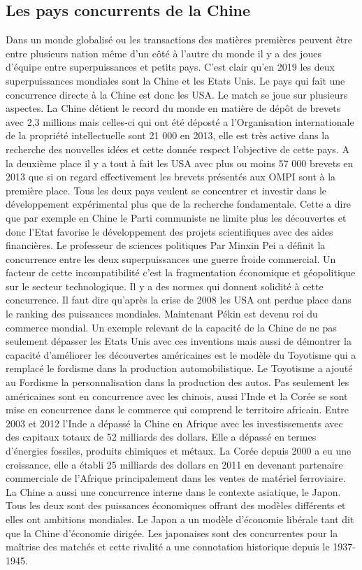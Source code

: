 \subsection{Les pays concurrents de la Chine}
Dans un monde globalisé ou les transactions des matières premières peuvent être entre plusieurs nation même d’un côté à l’autre du monde il y a des joues d’équipe entre superpuissances et petits pays. C’est clair qu’en 2019 les deux superpuissances mondiales sont la Chine et les Etats Unis. 
Le pays qui fait une concurrence directe à la Chine est donc les USA. Le match se joue sur plusieurs aspectes. La Chine détient le record du monde en matière de dépôt de brevets avec 2,3 millions mais celles-ci qui ont été déposté a l’Organisation internationale de la propriété intellectuelle sont 21 000 en 2013, elle est très active dans la recherche des nouvelles idées et cette donnée respect l’objective de cette pays. A la deuxième place il y a tout à fait les USA avec plus ou moins 57 000 brevets en 2013 que si on regard effectivement les brevets présentés aux OMPI sont à la première place. Tous les deux pays veulent se concentrer et investir dans le développement expérimental plus que de la recherche fondamentale.  Cette a dire que par exemple en Chine le Parti communiste ne limite plus les découvertes et donc l’Etat favorise le développement des projets scientifiques avec des aides financières.
Le professeur de sciences politiques Par Minxin Pei a définit la concurrence entre les deux superpuissances une guerre froide commercial. Un facteur de cette incompatibilité c’est la fragmentation économique et géopolitique sur le secteur technologique. Il y a des normes qui donnent solidité à cette concurrence.   
Il faut dire qu’après la crise de 2008 les USA ont perdue place dans le ranking des puissances mondiales.  Maintenant Pékin est devenu roi du commerce mondial.
Un exemple relevant de la capacité de la Chine de ne pas seulement dépasser les Etats Unis avec ces inventions mais aussi de démontrer la capacité d’améliorer les découvertes américaines est le modèle du Toyotisme qui a remplacé le fordisme dans la production automobilistique. Le Toyotisme a ajouté au Fordisme la personnalisation dans la production des autos.
Pas seulement les américaines sont en concurrence avec les chinois, aussi l’Inde et la Corée se sont mise en concurrence dans le commerce qui comprend le territoire africain. 
Entre 2003 et 2012 l’Inde a dépassé la Chine en Afrique avec les investissements avec des capitaux totaux de 52 milliards des dollars. Elle a dépassé en termes d’énergies fossiles, produits chimiques et métaux.
La Corée depuis 2000 a eu une croissance, elle a établi 25 milliards des dollars en 2011 en devenant partenaire commerciale de l’Afrique principalement dans les ventes de matériel ferroviaire.
La Chine a aussi une concurrence interne dans le contexte asiatique, le Japon. Tous les deux sont des puissances économiques offrant des modèles différents et elles ont ambitions mondiales. Le Japon a un modèle d’économie libérale tant dit que la Chine d’économie dirigée. Les japonaises sont des concurrentes pour la maîtrise des matchés et cette rivalité a une connotation historique depuis le 1937-1945.
